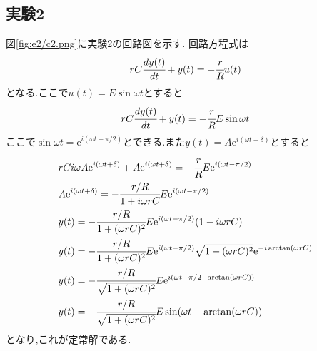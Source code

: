 \subsection{実験2}
図\ref{fig:e2/c2.png}に実験2の回路図を示す.
回路方程式は
\begin{align}
  rC\cfrac{dy(t)}{dt}+y(t)=-\cfrac{r}{R}u(t)
\end{align}
となる.ここで$u(t)=E\sin\omega t$とすると
\begin{align}
  rC\cfrac{dy(t)}{dt}+y(t)=-\cfrac{r}{R}E\sin\omega t
\end{align}
ここで$\sin\omega t=\mathrm{e}^{i(\omega t-\pi/2)}$とできる.また$y(t)=A\mathrm{e}^{i(\omega t+\delta)}$とすると
\begin{align}
  &rCi\omega A\mathrm{e}^{i(\omega t+\delta)}+A\mathrm{e}^{i(\omega t+\delta)}=-\cfrac{r}{R}E\mathrm{e}^{i(\omega t-\pi/2)}\\
  &A\mathrm{e}^{i(\omega t+\delta)}=-\cfrac{r/R}{1+i\omega rC}E\mathrm{e}^{i(\omega t-\pi/2)}\\
  &y(t)=-\cfrac{r/R}{1+(\omega rC)^2}E\mathrm{e}^{i(\omega t-\pi/2)}(1-i\omega rC)\\
  &y(t)=-\cfrac{r/R}{1+(\omega rC)^2}E\mathrm{e}^{i(\omega t-\pi/2)}\sqrt{1+(\omega rC)^2}\mathrm{e}^{-i\arctan(\omega rC)}\\
  &y(t)=-\cfrac{r/R}{\sqrt{1+(\omega rC)^2}}E\mathrm{e}^{i(\omega t-\pi/2-\arctan(\omega rC))}\\
  &y(t)=-\cfrac{r/R}{\sqrt{1+(\omega rC)^2}}E\sin(\omega t-\arctan(\omega rC))
\end{align}
となり,これが定常解である.
